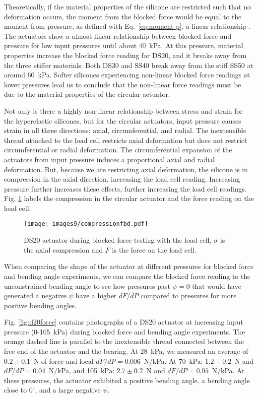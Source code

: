 Theoretically, if the material properties of the silicone are restricted such that no deformation occurs, the moment from the blocked force would be equal to the moment from pressure, as defined with Eq.~\ref{eq:moment-p}, a linear relationship \cite{polygerinos_modeling_2015}. The actuators show a almost linear relationship between blocked force and pressure for low input pressures until about 40~kPa. At this pressure, material properties increase the blocked force reading for DS20, and it breaks away from the three stiffer materials. Both DS30 and SS40 break away from the stiff SS50 at around 60~kPa. Softer silicones experiencing non-linear blocked force readings at lower pressures lead us to conclude that the non-linear force readings must be due to the material properties of the circular actuator.

Not only is there a highly non-linear relationship between stress and strain for the hyperelastic silicones, but for the circular actuators, input pressure causes strain in all three directions: axial, circumferential, and radial. The inextensible thread attached to the load cell restricts axial deformation but does not restrict circumferential or radial deformation. The circumferential expansion of the actuators from input pressure induces a proportional axial and radial deformation. But, because we are restricting axial deformation, the silicone is in compression in the axial direction, increasing the load cell reading. Increasing pressure further increases these effects, further increasing the load cell readings. Fig. \ref{fig:compressionfbd} labels the compression in the circular actuator and the force reading on the load cell. 

\begin{figure}[!ht]
    \centering
     \texttt{[image: images9/compressionfbd.pdf]}
    \caption{DS20 actuator during blocked force testing with the load cell, $\sigma$ is the axial compression and $F$ is the force on the load cell.}
    \label{fig:compressionfbd}
\end{figure}

When comparing the shape of the actuator at different pressures for blocked force and bending angle experiments, we can compare the blocked force reading to the unconstrained bending angle to see how pressures past $\psi=0$ that would have generated a negative $\psi$ have a higher $dF/dP$ compared to pressures for more positive bending angles.  

Fig. \ref{fig:d20force} contains photographs of a DS20 actuator at increasing input pressure (0-105~kPa) during blocked force and bending angle experiments. The orange dashed line is parallel to the inextensible thread connected between the free end of the actuator and the bearing. At 28~kPa, we measured an average of $0.2\pm0.1$~N of force and local $dF/dP=0.006$~N/kPa. At 70~kPa: $1.2\pm0.2$~N and $dF/dP=0.04$~N/kPa, and 105~kPa: $2.7\pm0.2$~N and $dF/dP=0.05$~N/kPa. At these pressures, the actuator exhibited a positive bending angle, a bending angle close to $0^\circ$, and a large negative $\psi$. 

